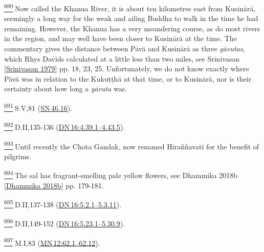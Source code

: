 \label{footprints_split_025.html_fn690}
\hyperref[footprints_split_017.htmlux5cux23fnref690]{\textsuperscript{690}} Now
called the Khanua River, it is about ten kilometres east from Kusinārā,
seemingly a long way for the weak and ailing Buddha to walk in the time
he had remaining. However, the Khanua has a very meandering course, as
do most rivers in the region, and may well have been closer to Kusinārā
at the time. The commentary gives the distance between Pāvā and Kusinārā
as three \emph{gāvutas}, which Rhys Davids calculated at a little less
than two miles, see {Srinivasan
{{[}\hyperref[footprints_split_022.htmlux5cux23Srinivasanux5cux25201979]{Srinivasan
1979}{]}}} pp. 18, 23, 25. Unfortunately, we do not know exactly where
Pāvā was in relation to the Kukuṭṭhā at that time, or to Kusinārā, nor
is their certainty about how long a \emph{gāvuta} was.

\label{footprints_split_025.html_fn691}
\hyperref[footprints_split_017.htmlux5cux23fnref691]{\textsuperscript{691}} S.V,81
(\href{https://suttacentral.net/sn46.16/en/sujato}{SN\,46.16}).

\label{footprints_split_025.html_fn692}
\hyperref[footprints_split_017.htmlux5cux23fnref692]{\textsuperscript{692}} D.II,135-136
(\href{https://suttacentral.net/dn16/en/sujato\#4.39.1}{DN\,16:4.39.1--4.43.5}).

\label{footprints_split_025.html_fn693}
\hyperref[footprints_split_017.htmlux5cux23fnref693]{\textsuperscript{693}} Until
recently the Chota Gandak, now renamed Hiraññavatī for the benefit of
pilgrims.

\label{footprints_split_025.html_fn694}
\hyperref[footprints_split_017.htmlux5cux23fnref694]{\textsuperscript{694}} The
sal has fragrant-smelling pale yellow flowers, see {Dhammika 2018b
{{[}\hyperref[footprints_split_022.htmlux5cux23Dhammikaux5cux25202018b]{Dhammika
2018b}{]}}} pp. 179-181.

\label{footprints_split_025.html_fn695}
\hyperref[footprints_split_017.htmlux5cux23fnref695]{\textsuperscript{695}} D.II,137-138
(\href{https://suttacentral.net/dn16/en/sujato\#5.2.1}{DN\,16:5.2.1--5.3.11}).

\label{footprints_split_025.html_fn696}
\hyperref[footprints_split_017.htmlux5cux23fnref696]{\textsuperscript{696}} D.II,149-152
(\href{https://suttacentral.net/dn16/en/sujato\#5.23.1}{DN\,16:5.23.1--5.30.9}).

\label{footprints_split_025.html_fn697}
\hyperref[footprints_split_017.htmlux5cux23fnref697]{\textsuperscript{697}} M.I,83
(\href{https://suttacentral.net/mn12/en/sujato\#62.1}{MN\,12:62.1--62.12}).

